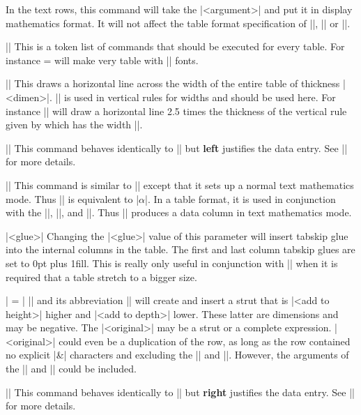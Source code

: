 In the text rows, this command will take the |<argument>| and put it in
display mathematics format. It will not affect the table format specification
of |\right|, |\left| or |\center|.


\mbr
\ext\@|\everytable|
\nbr
This is a token list of commands that should be executed for every table.
For instance
\begintt
\everytable ={\ninepoint}
\endtt
will make very table with |\ninepoint| fonts.



\mbr
\ext\@||
\nbr
This draws a horizontal line across the width of the entire table of
thickness |<dimen>|. |\tr| is used in vertical rules for widths and should be
used here. For instance |\fulltablerule{2.5\tr}| will draw a horizontal line
2.5 times the thickness of the vertical rule given by \vrt which has the 
width |\tr|.

\mbr
\ext\@|\left|
\nbr
This command behaves identically to |\center| but {\bf left} justifies the data
entry. See |\center| for more details.


\mbr
\ext\@||
\nbr
This command is similar to |\displaymath| except that it sets up a normal
text mathematics mode. Thus |\math{\alpha}| is equivalent to |$\alpha$|. In a
table format, it is used in conjunction with the |\center|, |\right|, and
|\left|. Thus |\math\center| produces a data column in text mathematics mode.

\mbr
\ext\@|\midtabglue [=] <glue>|
\nbr
Changing the |<glue>| value of this parameter will insert tabskip glue into
the internal columns in the table. The first and last column tabskip
glues  are set to 0pt plus 1fill. This is really only useful in conjunction with
|\tablespread| when it is required that a table stretch to a bigger size. 

\mbr
\ext\@|
\mst = \modifystrut|
\nbr
|\modifystrut| and its abbreviation |\mst| will create and insert a strut
that is |<add to height>| higher and |<add to depth>| lower. These latter are 
dimensions and may be negative. The |<original>| may be a strut or a complete
expression. |<original>| could even be a duplication of the row, 
as long as the row contained no explicit |&| characters and excluding the
|\br| and |\er|. However, the arguments of the |\br| and |\er| could be
included.


\mbr
\ext\@|\right|
\nbr
This command behaves identically to |\center| but {\bf right} justifies the data
entry. See |\center| for more details.


